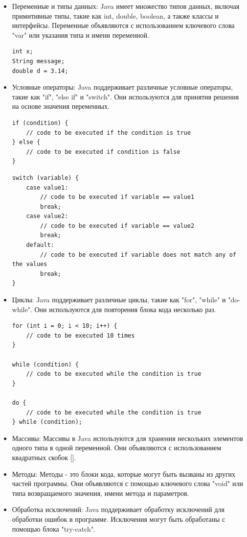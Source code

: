 \begin{itemize}
\item Переменные и типы данных: Java имеет множество типов данных, включая примитивные типы, такие как int, double, boolean, а также классы и интерфейсы. Переменные объявляются с использованием ключевого слова "var" или указания типа и имени переменной.

\begin{lstlisting}
int x;
String message;
double d = 3.14;
\end{lstlisting}

\item Условные операторы: Java поддерживает различные условные операторы, такие как "if", "else if" и "switch". Они используются для принятия решения на основе значения переменных.

\begin{lstlisting}
if (condition) {
    // code to be executed if the condition is true
} else {
    // code to be executed if condition is false
}
\end{lstlisting}

\begin{lstlisting}
switch (variable) {
    case value1:
        // code to be executed if variable == value1
        break;
    case value2:
        // code to be executed if variable == value2
        break;
    default:
        // code to be executed if variable does not match any of the values
        break;
}
\end{lstlisting}

\item Циклы: Java поддерживает различные циклы, такие как "for", "while" и "do-while". Они используются для повторения блока кода несколько раз.

\begin{lstlisting}
for (int i = 0; i < 10; i++) {
    // code to be executed 10 times
}

while (condition) {
    // code to be executed while the condition is true
}

do {
    // code to be executed while the condition is true
} while (condition);
\end{lstlisting}

\item Массивы: Массивы в Java используются для хранения нескольких элементов одного типа в одной переменной. Они объявляются с использованием квадратных скобок [].
\item Методы: Методы - это блоки кода, которые могут быть вызваны из других частей программы. Они объявляются с помощью ключевого слова "void" или типа возвращаемого значения, имени метода и параметров.
\item Обработка исключений: Java поддерживает обработку исключений для обработки ошибок в программе. Исключения могут быть обработаны с помощью блока "try-catch".


\end{itemize}
